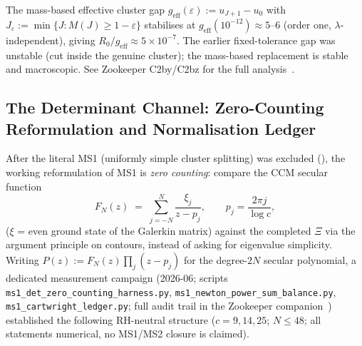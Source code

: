 \documentclass[12pt,a4paper]{article}
\theoremstyle{definition}
\theoremstyle{remark}
\begin{document}
The mass-based effective cluster gap
$g_{\text{eff}}(\varepsilon) := u_{J+1}-u_0$ with
$J_\varepsilon := \min\{J: M(J)\ge 1-\varepsilon\}$ stabilises at
$g_{\text{eff}}(10^{-12}) \approx 5\text{--}6$ (order one,
$\lambda$-independent), giving
$R_0/g_{\text{eff}}\approx 5\times 10^{-7}$. The earlier
fixed-tolerance gap was unstable (cut inside the genuine cluster); the
mass-based replacement is stable and macroscopic. See Zookeeper C2by/C2bz
for the full analysis~\cite{Geiger2026zookeeper}.


\subsection{The Determinant Channel: Zero-Counting Reformulation and
Normalisation Ledger}
\label{sec:det-channel}

After the literal MS1 (uniformly simple cluster splitting) was excluded
(), the working reformulation of MS1 is
\emph{zero counting}: compare the CCM secular function
\[
  F_N(z) \;=\; \sum_{j=-N}^{N} \frac{\xi_j}{z-p_j},
  \qquad p_j = \frac{2\pi j}{\log c},
\]
($\xi$ = even ground state of the Galerkin matrix) against the completed
$\Xi$ via the argument principle on contours, instead of asking for
eigenvalue simplicity. Writing $P(z) := F_N(z)\prod_{j}(z-p_j)$ for the
degree-$2N$ secular polynomial, a dedicated measurement campaign
(2026-06; scripts \texttt{ms1\_det\_zero\_counting\_harness.py},
\texttt{ms1\_newton\_power\_sum\_balance.py},
\texttt{ms1\_cartwright\_ledger.py}; full audit trail in the Zookeeper
companion~\cite{Geiger2026zookeeper}) established the following
RH-neutral structure ($c = 9, 14, 25$; $N \le 48$; all statements
numerical, no MS1/MS2 closure is claimed).
\end{document}

